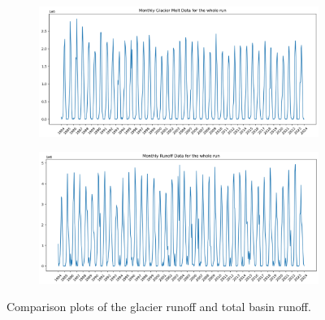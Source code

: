 \documentclass{article}
\begin{document}
\begin{figure}[h]
    \centering
    \begin{subfigure}[b]{\textwidth}
        \centering
        \includegraphics[width=\textwidth]{Plots/glacier_runoff.png}
        \label{fig:glacier_runoff}
    \end{subfigure}
    \hfill
    \begin{subfigure}[b]{\textwidth}
        \centering
        \includegraphics[width=\textwidth]{Plots/all_runoff.png}
        \label{fig:all_runoff}
    \end{subfigure}
    \caption{Comparison plots of the glacier runoff and total basin runoff.}
    \label{fig:runoff_compare}
\end{figure}
\FloatBarrier
\end{document}
